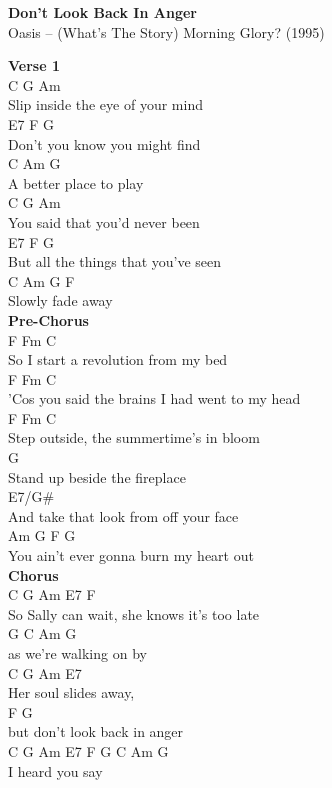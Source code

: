\documentclass[a4paper]{article}
\begin{document}
    \begin{center}
        \textbf{Don't Look Back In Anger}
        ~\\
        Oasis -- (What's The Story) Morning Glory? (1995)
    \end{center}
    {
        \scriptsize
        \textbf{Verse 1}
        ~\\
        {
            \cutive
            \obeyspaces
C               G            Am
\\
Slip inside the eye of your mind
\\
          E7             F    G
\\
Don't you know you might find
\\
                  C      Am G
\\
A better place to play
\\
C             G           Am
\\
You said that you'd never been
\\
            E7                 F    G
\\
But all the things that you've seen
\\
             C    Am G F
\\
Slowly fade away
\\

        }
        \textbf{Pre-Chorus}
        ~\\
        {
            \cutive
            \obeyspaces
F                Fm             C
\\
So I start a revolution from my bed
\\
         F                 Fm             C
\\
'Cos you said the brains I had went to my head
\\
F                 Fm              C
\\
Step outside, the summertime's in bloom
\\
G
\\
Stand up beside the fireplace
\\
    E7/G\#
\\
And take that look from off your face
\\
Am             G             F         G
\\
You ain't ever gonna burn my heart out
\\

        }
        \textbf{Chorus}
        ~\\
        {
            \cutive
            \obeyspaces
C  G         Am        E7             F
\\
So Sally can wait, she knows it's too late
\\
         G          C   Am G
\\
as we're walking on by
\\
    C    G       Am   E7
\\
Her soul slides away,
\\
               F             G
\\
but don't look back in anger
\\
            C   G   Am   E7   F   G   C   Am G
\\
I heard you say
\\

}}
\end{document}
